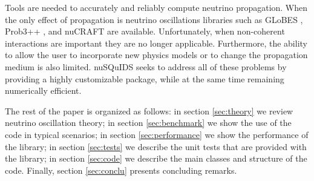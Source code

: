 \documentclass[3p,12pt]{elsarticle}
\newcommand{\ttf}{\ttfamily}
\begin{document}
Tools are needed to accurately and reliably compute neutrino
propagation.
When the only effect of propagation is neutrino oscillations libraries such as {\ttf GLoBES}
\citep{Huber:2007ji}, {\ttf Prob3++} \citep{prob3pp, Calland:2013vaa},
and {\ttf nuCRAFT} \citep{Wallraff:2014vl} are
available. Unfortunately, when non-coherent interactions are 
important they are no longer applicable. Furthermore, the ability to
allow the user to incorporate new physics models or to change the
propagation medium is also limited. {\ttf nuSQuIDS} seeks to
address all of these problems by providing a highly customizable
package, while at the same time remaining numerically efficient.

The rest of the paper is organized as follows: in section
\ref{sec:theory} we review neutrino oscillation theory; in section
\ref{sec:benchmark} we show the use of the code in typical
scenarios; in section \ref{sec:performance} we show the performance of
the library; in section \ref{sec:tests} we describe the unit tests that
are provided with the library; in section \ref{sec:code} we describe
the main classes and structure of the code. Finally, section
\ref{sec:conclu} presents concluding remarks.
\end{document}
